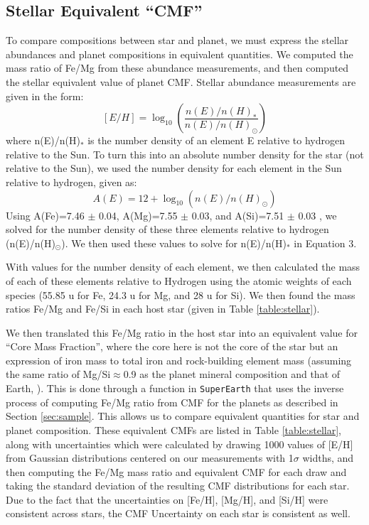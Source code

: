 \documentclass[twocolumn]{aastex631}
\begin{document}
\subsection{Stellar Equivalent ``CMF''}
\label{sec:Star_CMF}
To compare compositions between star and planet, we must express the stellar abundances and planet compositions in equivalent quantities. We computed the mass ratio of Fe/Mg from these abundance measurements, and then computed the stellar equivalent value of planet CMF. Stellar abundance measurements are given in the form:
\begin{equation}
  [E/H]=\log_{10}(\frac{n(E)/n(H)_{*}}{n(E)/n(H)_{\odot}})
\end{equation}
where n(E)/n(H)$_{*}$ is the number density of an element E relative to hydrogen relative to the Sun. To turn this into an absolute number density for the star (not relative to the Sun), we used the number density for each element in the Sun relative to hydrogen, given as:
\begin{equation}
    A(E)=12 + \log_{10}(n(E)/n(H)_{\odot})
\end{equation}
Using A(Fe)=7.46 $\pm$ 0.04, A(Mg)=7.55 $\pm$ 0.03, and A(Si)=7.51 $\pm$ 0.03 \citep{2021A&A...653A.141A}, we solved for the number density of these three elements relative to hydrogen (n(E)/n(H)$_{\odot}$). We then used these values to solve for n(E)/n(H)$_{*}$ in Equation 3. 

With values for the number density of each element, we then calculated the mass of each of these elements relative to Hydrogen using the atomic weights of each species (55.85 u for Fe, 24.3 u for Mg, and 28 u for Si). We then found the mass ratios Fe/Mg and Fe/Si in each host star (given in Table \ref{table:stellar}). 

We then translated this Fe/Mg ratio in the host star into an equivalent value for ``Core Mass Fraction'', where the core here is not the core of the star but an expression of iron mass to total iron and rock-building element mass (assuming the same ratio of Mg/Si$\approx$0.9 as the planet mineral composition and that of Earth, \citealt{1995ChGeo.120..223M}). This is done through a function in \texttt{SuperEarth} that uses the inverse process of computing Fe/Mg ratio from CMF for the planets as described in Section \ref{sec:sample}. This allows us to compare equivalent quantities for star and planet composition. These equivalent CMFs are listed in Table \ref{table:stellar}, along with uncertainties which were calculated by drawing 1000 values of [E/H] from Gaussian distributions centered on our measurements with 1$\sigma$ widths, and then computing the Fe/Mg mass ratio and equivalent CMF for each draw and taking the standard deviation of the resulting CMF distributions for each star. Due to the fact that the uncertainties on [Fe/H], [Mg/H], and [Si/H] were consistent across stars, the CMF Uncertainty on each star is consistent as well. 
\end{document}
